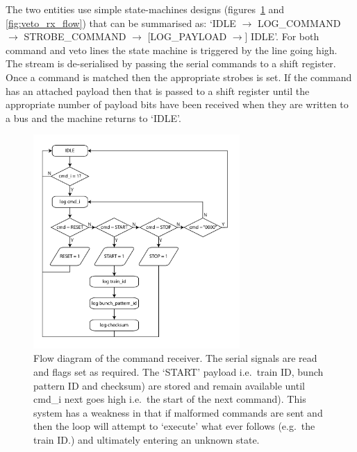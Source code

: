 The two entities use simple state-machines designs (figures~\ref{fig:cmd_rx_flow} and \ref{fig:veto_rx_flow}) that can be summarised as: `IDLE \( \rightarrow \) LOG\_COMMAND \( \rightarrow \) STROBE\_COMMAND \( \rightarrow \) [LOG\_PAYLOAD \( \rightarrow \)] IDLE'. For both command and veto lines the state machine is triggered by the line going high. The stream is de-serialised by passing the serial commands to a shift register. Once a command is matched then the appropriate strobes is set. If the command has an attached payload then that is passed to a shift register until the appropriate number of payload bits have been received when they are written to a bus and the machine returns to `IDLE'.
\begin{figure}[htbp]
  \centering
  \includegraphics[width=0.7\textwidth]{images/pdfs/cmd_rx_flow.pdf}
  \caption{Flow diagram of the command receiver. The serial signals are read and flags set as required. The `START' payload i.e.\  train ID, bunch pattern ID and checksum) are stored and remain available until cmd\_i next goes high i.e.\  the start of the next command). This system has a weakness in that if malformed commands are sent and then the loop will attempt to `execute' what ever follows (e.g.\ the train ID.) and ultimately entering an unknown state.}
  \label{fig:cmd_rx_flow}
\end{figure}
